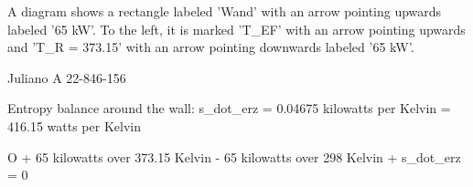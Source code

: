 A diagram shows a rectangle labeled 'Wand' with an arrow pointing upwards labeled '65 kW'. To the left, it is marked 'T_EF' with an arrow pointing upwards and 'T_R = 373.15' with an arrow pointing downwards labeled '65 kW'.  

Juliano A 22-846-156  

Entropy balance around the wall:  
s_dot_erz = 0.04675 kilowatts per Kelvin = 416.15 watts per Kelvin  

O + 65 kilowatts over 373.15 Kelvin - 65 kilowatts over 298 Kelvin + s_dot_erz = 0